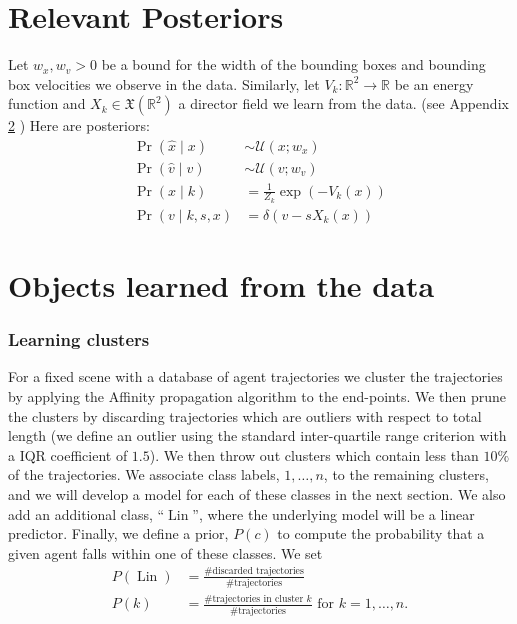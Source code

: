 \documentclass[12pt]{amsart}
\DeclareMathOperator{\Lin}{Lin}
\begin{document}
\appendix

\section{Relevant Posteriors}
Let $w_x, w_v  > 0$ be a bound for the width of the bounding boxes and bounding box velocities we observe in the data.
Similarly, let $V_k: \mathbb{R}^2 \to \mathbb{R}$ be an energy function and $X_k \in \mathfrak{X}( \mathbb{R}^2)$ a director field we learn from the data. (see Appendix \ref{app:learning} )
Here are posteriors:
\begin{align*}
	\Pr( \hat{x} \mid x ) &\sim \mathcal{U}( x ; w_x ) \\
	\Pr( \hat{v} \mid v ) &\sim \mathcal{U}( v ; w_v ) \\
	\Pr( x \mid k ) &= \frac{1}{Z_k} \exp \left( -V_k(x) \right) \\
	\Pr( v \mid k,s,x) &= \delta( v - s X_k(x) )
\end{align*}

\section{Objects learned from the data}
\label{app:learning}

\subsubsection{Learning clusters}
For a fixed scene with a database of agent trajectories we cluster the trajectories by applying the Affinity propagation algorithm to the end-points.
We then prune the clusters by discarding trajectories which are outliers with respect to total length (we define an outlier using the standard inter-quartile range criterion with a IQR coefficient of $1.5$).
We then throw out clusters which contain less than $10\%$ of the trajectories.
We associate class labels, $1,\dots,n$,  to the remaining clusters, and we will develop a model for each of these classes in the next section.
We also add an additional class, ``$\Lin$'', where the underlying model will be a linear predictor.
Finally, we define a prior, $P(c)$ to compute the probability that a given agent falls within one of these classes.
We set 
\begin{align*}
	P(\Lin) &= \frac{ \text{\# discarded trajectories} }{ \text{ \# trajectories } } \\
	P(k) &= \frac{ \text{\# trajectories in cluster $k$} }{ \text{ \# trajectories } } \text{ for } k=1,\dots,n.
\end{align*}
\end{document}
